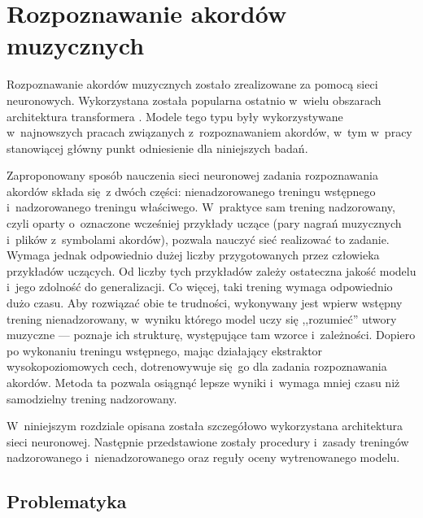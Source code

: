 \chapter{Rozpoznawanie akordów muzycznych} \label{chapter:methodology}


Rozpoznawanie akordów muzycznych zostało zrealizowane za pomocą sieci neuronowych. Wykorzystana została popularna ostatnio w~wielu obszarach architektura transformera \cite{vaswani_attention_2017}. Modele tego typu były wykorzystywane w~najnowszych pracach związanych z~rozpoznawaniem akordów, w~tym w~pracy \cite{park_bi-directional_2019} stanowiącej główny punkt odniesienie dla niniejszych badań.

Zaproponowany sposób nauczenia sieci neuronowej zadania rozpoznawania akordów składa się z dwóch części: nienadzorowanego treningu wstępnego i~nadzorowanego treningu właściwego. W~praktyce sam trening nadzorowany, czyli oparty o~oznaczone wcześniej przykłady uczące (pary nagrań muzycznych i~plików z~symbolami akordów), pozwala nauczyć sieć realizować to zadanie. Wymaga jednak odpowiednio dużej liczby przygotowanych przez człowieka przykładów uczących. Od liczby tych przykładów zależy ostateczna jakość modelu i~jego zdolność do generalizacji. Co więcej, taki trening wymaga odpowiednio dużo czasu. Aby rozwiązać obie te trudności, wykonywany jest wpierw wstępny trening nienadzorowany, w~wyniku którego model uczy się ,,rozumieć'' utwory muzyczne --- poznaje ich strukturę, występujące tam wzorce i~zależności. Dopiero po wykonaniu treningu wstępnego, mając działający ekstraktor wysokopoziomowych cech, dotrenowywuje się go dla zadania rozpoznawania akordów. Metoda ta pozwala osiągnąć lepsze wyniki i~wymaga mniej czasu niż samodzielny trening nadzorowany.

W~niniejszym rozdziale opisana została szczegółowo wykorzystana architektura sieci neuronowej.  Następnie przedstawione zostały procedury i~zasady treningów nadzorowanego i~nienadzorowanego oraz reguły oceny wytrenowanego modelu.



\section{Problematyka}

